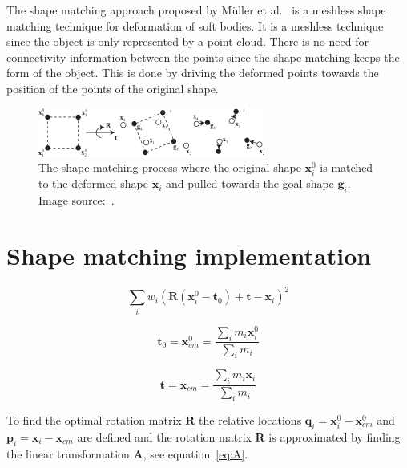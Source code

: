     The shape matching approach proposed by M\"uller et al.~\cite{shapematching} is a meshless shape matching technique for deformation of soft bodies.
    It is a meshless technique since the object is only represented by a point cloud.
    There is no need for connectivity information between the points since the shape matching keeps the form of the object.
    This is done by driving the deformed points towards the position of the points of the original shape.
    
    \begin{figure}
    \includegraphics[width=\linewidth]{img/deformation2.png}
    \caption{The shape matching process where the original shape $\mathbf{x}^0_i$ is matched to the deformed shape $\mathbf{x}_i$ and pulled towards the goal shape $\mathbf{g}_i$. Image source:~\cite{shapematching}.}
    \label{fig:def}
    \end{figure}
    
\section{Shape matching implementation}

   
    \begin{equation} \label{eq:min}
        \sum_i{w_i(\mathbf{R}(\mathbf{x}_i^0 - \mathbf{t}_0) + \mathbf{t} - \mathbf{x}_i)^2}
    \end{equation}

    \begin{equation} \label{eq:com1}
        \mathbf{t}_0 = \mathbf{x}^0_{cm} = \frac{\sum_i{m_i\mathbf{x}_i^0}}{\sum_i{m_i}}
    \end{equation}

    \begin{equation} \label{eq:com2}
        \mathbf{t} = \mathbf{x}_{cm} = \frac{\sum_i{m_i\mathbf{x}_i}}{\sum_i{m_i}}
    \end{equation}

    To find the optimal rotation matrix $\mathbf{R}$ the relative locations 
    $\mathbf{q}_i = \mathbf{x}^0_i - \mathbf{x}^0_{cm}$ and 
    $\mathbf{p}_i = \mathbf{x}_i - \mathbf{x}_{cm}$ are defined and the rotation matrix 
    $\mathbf{R}$ is approximated by finding the linear transformation $\mathbf{A}$, see equation~\ref{eq:A}.

